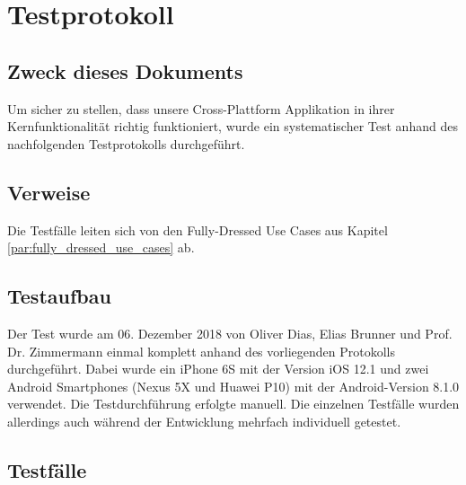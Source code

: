 \section{Testprotokoll}
\subsection{Zweck dieses Dokuments}
Um sicher zu stellen, dass unsere Cross-Plattform Applikation in ihrer Kernfunktionalität richtig funktioniert, wurde ein systematischer Test anhand des nachfolgenden Testprotokolls durchgeführt.

\subsection{Verweise}
Die Testfälle leiten sich von den Fully-Dressed Use Cases aus Kapitel \ref{par:fully_dressed_use_cases} ab.

\subsection{Testaufbau}
Der Test wurde am 06. Dezember 2018 von Oliver Dias, Elias Brunner und Prof. Dr. Zimmermann einmal komplett anhand des vorliegenden Protokolls durchgeführt. Dabei wurde ein iPhone 6S mit der Version iOS 12.1 und zwei Android Smartphones (Nexus 5X und Huawei P10) mit der Android-Version 8.1.0 verwendet. Die Testdurchführung erfolgte manuell. Die einzelnen Testfälle wurden allerdings auch während der Entwicklung mehrfach individuell getestet.

\subsection{Testfälle}


